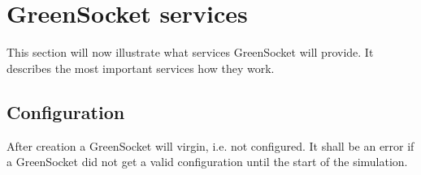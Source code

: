 \documentclass[a4paper,10pt]{article}          %
\begin{document}


%  
%  


%

\section{GreenSocket services}

This section will now illustrate what services GreenSocket will provide. It describes the most important services how they work.

\vspace{4mm}
\subsection{Configuration}
\vspace{4mm}

After creation a GreenSocket will virgin, i.e. not configured.
It shall be an error if a GreenSocket did not get a valid configuration until the start of the simulation.
\end{document}
